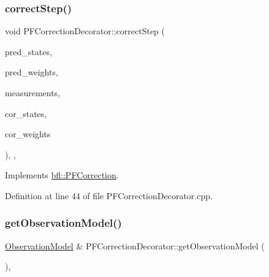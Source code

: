 \mbox{\label{classbfl_1_1PFCorrectionDecorator_abb5ab0ef4245b67be546360a54416498}} 
\subsubsection{\texorpdfstring{correct\+Step()}{correctStep()}}
{\footnotesize\ttfamily void P\+F\+Correction\+Decorator\+::correct\+Step (\begin{DoxyParamCaption}\item[{const Eigen\+::\+Ref$<$ const Eigen\+::\+Matrix\+Xf $>$ \&}]{pred\+\_\+states,  }\item[{const Eigen\+::\+Ref$<$ const Eigen\+::\+Vector\+Xf $>$ \&}]{pred\+\_\+weights,  }\item[{const Eigen\+::\+Ref$<$ const Eigen\+::\+Matrix\+Xf $>$ \&}]{measurements,  }\item[{Eigen\+::\+Ref$<$ Eigen\+::\+Matrix\+Xf $>$}]{cor\+\_\+states,  }\item[{Eigen\+::\+Ref$<$ Eigen\+::\+Vector\+Xf $>$}]{cor\+\_\+weights }\end{DoxyParamCaption})\hspace{0.3cm}{\ttfamily [override]}, {\ttfamily [protected]}, {\ttfamily [virtual]}}



Implements \mbox{\hyperlink{classbfl_1_1PFCorrection_a3fb61b90d36bea3271c1c9e363c61229}{bfl\+::\+P\+F\+Correction}}.



Definition at line 44 of file P\+F\+Correction\+Decorator.\+cpp.

\mbox{\label{classbfl_1_1PFCorrectionDecorator_a7bafd701e4a97efc55ba7fea6125cc7f}} 
\subsubsection{\texorpdfstring{get\+Observation\+Model()}{getObservationModel()}}
{\footnotesize\ttfamily \mbox{\hyperlink{classbfl_1_1ObservationModel}{Observation\+Model}} \& P\+F\+Correction\+Decorator\+::get\+Observation\+Model (\begin{DoxyParamCaption}{ }\end{DoxyParamCaption})\hspace{0.3cm}{\ttfamily [override]}, {\ttfamily [virtual]}}



